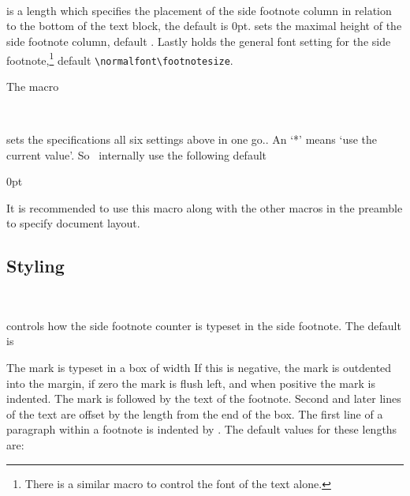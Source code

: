 \begin{syntax}
  \lnc{\sidefootadjust}\\
  \cmd{\setsidefootheight}\\
  \cmd{\sidefootfont}\\
\end{syntax}
\cmd{\sidefootadjust} is a length which specifies the placement of the
side footnote column in relation to the bottom of the text block, the
default is 0pt. \cmd{\setsidefootheight} sets the maximal height of
the side footnote column, default . Lastly
\cmd{\sidefootfont} holds the general font setting for the side
footnote,\footnote{There is a similar macro to control the font of the
  text alone.} default \verb?\normalfont\footnotesize?.


The macro
\begin{syntax}
   \cmd{\setsidefeet}\\
\end{syntax}
sets the specifications all six settings above in one go.. An `*'
means `use the current value'. So \theclass\ internally use the
following default
\begin{lcode}
  \setsidefeet{\marginparsep}{\marginparwidth}%
  {\onelineskip}{0pt}%
  {\normalfont\footnotesize}{\textheight}%
\end{lcode}
It is recommended to use this macro along with the other macros in the
preamble to specify document layout.

\subsection{Styling 
  \texorpdfstring{}{sidefootnote}} 


\begin{syntax}
  \cmd{\sidefootmarkstyle}\\
\end{syntax}
controls how the side footnote counter is typeset in the side
footnote. The default is
\begin{lcode}
\end{lcode}

The mark is typeset in a box of width \lnc{\sidefootmarkwidth}
If this is negative, the mark is outdented
into the margin, if zero the mark is flush left, and when positive
the mark is indented. The mark is followed by the 
text of the footnote. Second and later lines of the
text are offset by the length \lnc{\sidefootmarksep} from the end of the box.
The first line of a paragraph within a footnote is indented by
\lnc{\sidefootparindent}. The default values for these lengths are:
\begin{lcode}
  \setlength{\sidefootmarkwidth}{0em}
  \setlength{\sidefootmarksep}{0em}
  \setlength{\sidefootparindent}{1em}
\end{lcode}


